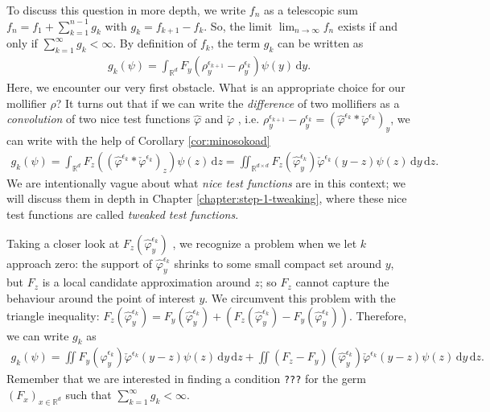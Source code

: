 To discuss this question in more depth, we write $f_n$ as a telescopic sum $f_n = f_1 + \sum^{n-1}_{k=1}g_k$ with $g_k = f_{k+1} - f_k$. So, the limit $\lim_{n \to \infty} f_n$ exists if and only if $\sum^\infty_{k=1}g_k < \infty$. By definition of $f_{k}$, the term $g_k$ can be written as  
\begin{align*}
        g_k(\psi) = \int_{\mathbb{R}^d} F_y(\rho_y^{\epsilon_{k+1}} - \rho_y^{\epsilon_k}) \psi(y)\, \mathrm{d}y.
\end{align*}
Here, we encounter our very first obstacle. What is an appropriate choice for our mollifier $\rho$? It turns out that if we can write the \emph{difference} of two mollifiers as a \emph{convolution} of two nice test functions $\hat \varphi$ and $\check \varphi$ , i.e. $ \rho^{\epsilon_{k+1}}_y - \rho^{\epsilon_k}_y = (\hat \varphi^{\epsilon_k} * \check \varphi^{\epsilon_k})_y$, 
we can write with the help of Corollary \ref{cor:minosokoad}
\begin{align*}
    g_k(\psi) = \int_{\mathbb{R}^d} F_z((\hat \varphi^{\epsilon_k} * \check \varphi^{\epsilon_k})_z) \psi(z)\, \mathrm{d}z
    = \iint_{\mathbb{R}^{d \times d}} F_z(\hat \varphi^{\epsilon_k}_y) \check \varphi^{\epsilon_k}(y-z) \psi(z) \, \mathrm{d}y\, \mathrm{d}z.
\end{align*}
We are intentionally vague about what \emph{nice test functions} are in this context; we will discuss them in depth in Chapter \ref{chapter:step-1-tweaking}, where these nice test functions are called \emph{tweaked test functions}.

Taking a closer look at $F_z(\hat \varphi^{\epsilon_k}_y)$ \label{sec:motiadsd}, we recognize a problem when we let $k$ approach zero: the support of $\hat \varphi^{\epsilon_k}_y$ shrinks to some small compact set around $y$, but $F_z$ is a local candidate approximation around $z$; so $F_z$ cannot capture the behaviour around the point of interest $y$. We circumvent this problem with the triangle inequality: $F_z(\hat \varphi^{\epsilon_k}_y) = F_y(\hat \varphi^{\epsilon_k}_y) + \left(F_z(\hat \varphi^{\epsilon_k}_y) - F_y(\hat \varphi^{\epsilon_k}_y)\right)$. 
Therefore, we can write $g_k$ as 
\begin{align*}
        g_k(\psi) = \iint F_y(\hat \varphi^{\epsilon_k}_y) \check \varphi^{\epsilon_k}(y-z) \psi(z) \, \mathrm{d}y\, \mathrm{d}z 
        + \iint (F_z - F_y)(\hat \varphi^{\epsilon_k}_y) \check \varphi^{\epsilon_k}(y-z) \psi(z) \, \mathrm{d}y\, \mathrm{d}z .
\end{align*}
Remember that we are interested in finding a condition \texttt{???} for the germ $(F_x)_{x \in \mathbb{R}^d}$  such that $\sum^\infty_{k=1} g_k < \infty$. 

